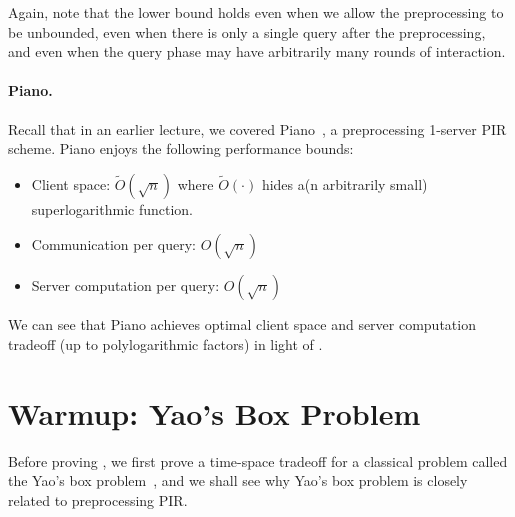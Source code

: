 Again, note that the lower bound 
holds even when we allow the preprocessing to be unbounded, 
even when there is only a single query
after the preprocessing, 
and even when 
the query phase may have arbitrarily many rounds of interaction. 



\paragraph{Piano.}
Recall that in an earlier lecture, 
we covered Piano~\cite{piano}, a preprocessing 1-server PIR scheme. 
Piano enjoys 
the following performance bounds:
\begin{itemize}[leftmargin=7mm]
    \item Client space: $\widetilde{O}(\sqrt{n})$
where $\widetilde{O}(\cdot)$ hides a(n  arbitrarily small) superlogarithmic function.
    \item Communication per query: $O(\sqrt{n})$
    \item Server computation per query: ${O}(\sqrt{n})$
\end{itemize}

We can see that Piano achieves optimal 
client space and server computation tradeoff (up to polylogarithmic factors)
in light of .





\section{Warmup: Yao's Box Problem}
Before proving , 
we first prove a time-space tradeoff for a classical problem
called the Yao's box problem~\cite{yao}, and we shall
see why 
Yao's box problem is closely related to preprocessing PIR.

